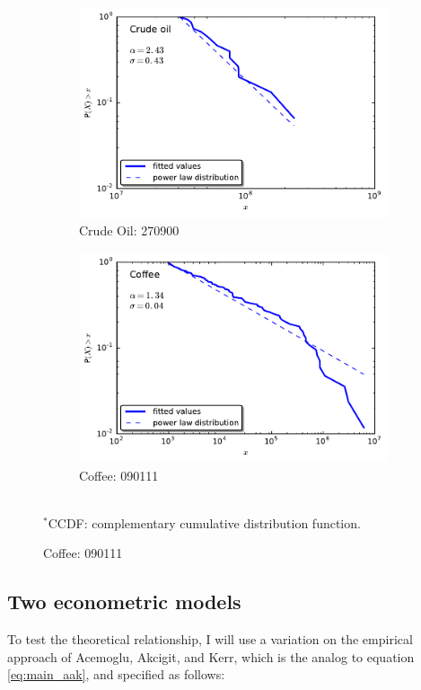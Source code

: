\documentclass[10pt,letterpaper]{article}
\begin{document}
\begin{figure}[!htb]\label{fig:CCDF}
  \caption{Sample fit to CCDF$^*$ for two products, 2014}
  \centering
  \begin{subfigure}[b]{0.65\textwidth}
  \includegraphics[width=\textwidth]{plots/oil_ccdf.pdf} 
  \caption{Crude Oil: 270900}
  \end{subfigure}
  \begin{subfigure}[b]{0.65\textwidth}
  \includegraphics[width=\textwidth]{plots/coffee_ccdf.pdf} 
  \caption{Coffee: 090111}
  \end{subfigure}  \\
\footnotesize{$^*$CCDF: complementary cumulative distribution function.}
\end{figure} 


\subsection{Two econometric models} \label{models-econometric}
To test the theoretical relationship, I will use a variation on the empirical approach of Acemoglu, Akcigit, and Kerr, which is the analog to equation \ref{eq:main_aak}, and specified as follows:
\end{document}
